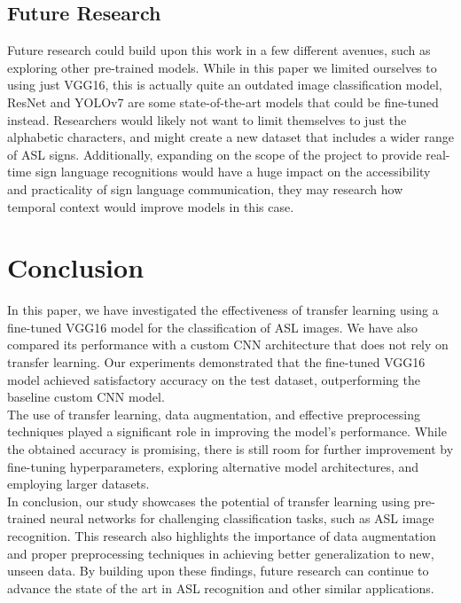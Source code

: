 \documentclass[12pt]{article}
\begin{document}
\subsection{Future Research}
Future research could build upon this work in a few different avenues, such as exploring other pre-trained models. While in this paper we limited ourselves to using just VGG16, this is actually quite an outdated image classification model, 
ResNet and YOLOv7 are some state-of-the-art models that could be fine-tuned instead. Researchers would likely not want to limit themselves to just the alphabetic characters, and might create a new dataset that includes a wider range of ASL signs.
Additionally, expanding on the scope of the project to provide real-time sign language recognitions would have a huge impact on the accessibility and practicality of sign language communication, they may research how temporal context would improve models in this case.

\section{Conclusion}
In this paper, we have investigated the effectiveness of transfer learning using a fine-tuned VGG16 model for the classification of ASL images. We have also compared its performance with a custom CNN architecture that does not rely on transfer learning. Our experiments demonstrated that the fine-tuned VGG16 model achieved satisfactory accuracy on the test dataset, outperforming the baseline custom CNN model.\\

The use of transfer learning, data augmentation, and effective preprocessing techniques played a significant role in improving the model's performance. While the obtained accuracy is promising, there is still room for further improvement by fine-tuning hyperparameters, exploring alternative model architectures, and employing larger datasets.\\

In conclusion, our study showcases the potential of transfer learning using pre-trained neural networks for challenging classification tasks, such as ASL image recognition. This research also highlights the importance of data augmentation and proper preprocessing techniques in achieving better generalization to new, unseen data. By building upon these findings, future research can continue to advance the state of the art in ASL recognition and other similar applications.\\

\end{document}
